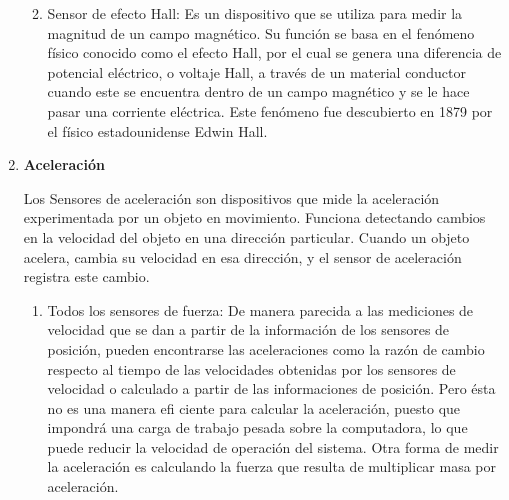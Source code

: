 \begin{enumerate}
\begin{enumerate}
				\begin{figure}[h]
					\centering
					\hfill
				\end{figure}
				
				\item Sensor de efecto Hall: Es un dispositivo que se utiliza para medir la magnitud de un campo magnético. Su función se basa en el fenómeno físico conocido como el efecto Hall, por el cual se genera una diferencia de potencial eléctrico, o voltaje Hall, a través de un material conductor cuando este se encuentra dentro de un campo magnético y se le hace pasar una corriente eléctrica. Este fenómeno fue descubierto en 1879 por el físico estadounidense Edwin Hall.\cite{Hall} \\
				
			\begin{figure}[h]
				\centering
				\hfill
			\end{figure}
			
			\end{enumerate}
			
			\item \textbf{Aceleración}
			
			Los Sensores de aceleración son dispositivos que mide la aceleración experimentada por un objeto en movimiento. Funciona detectando cambios en la velocidad del objeto en una dirección particular. Cuando un objeto acelera, cambia su velocidad en esa dirección, y el sensor de aceleración registra este cambio. \cite{Aceleración} \\
			
			\begin{enumerate}
				\item Todos los sensores de fuerza: De manera parecida a las mediciones de velocidad que se dan a partir de la información de los sensores de posición, pueden encontrarse las aceleraciones como la razón de cambio respecto al tiempo de las velocidades obtenidas por los sensores de velocidad o calculado a partir de las informaciones de posición. Pero ésta no es una manera efi ciente para calcular la aceleración, puesto que impondrá una carga de trabajo pesada sobre la computadora, lo que puede reducir la velocidad de operación del sistema. Otra forma de medir la aceleración es calculando la fuerza que resulta de multiplicar masa por aceleración. \cite{saha2010robotics}\\
			\end{enumerate}
				\begin{figure}[h]
				\centering
				\hfill
			\end{figure}
			

\end{enumerate}
